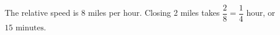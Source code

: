 The relative speed is 8 miles per hour. Closing 2 miles takes $\dfrac{2}{8}=\dfrac{1}{4}$ hour, or $\boxed{15\text{ minutes}}$.
